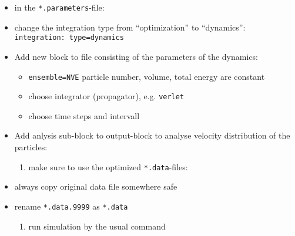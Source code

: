 \documentclass[11pt]{article}
\begin{document}
\begin{itemize}
\item in the \texttt{*.parameters}-file:
\item change the integration type from ``optimization'' to ``dynamics'': \texttt{integration: type=dynamics}
\item Add new block to file consisting of the parameters of the dynamics:

\begin{itemize}
\item \texttt{ensemble=NVE} particle number, volume, total energy are constant
\item choose integrator (propagator), e.g. \texttt{verlet}
\item choose time steps and intervall
\end{itemize}

\item Add anlysis sub-block to output-block to analyse velocity distribution of the particles:

\begin{enumerate}
\item make sure to use the optimized \texttt{*.data}-files:
\end{enumerate}

\item always copy original data file somewhere safe
\item rename \texttt{*.data.9999} as \texttt{*.data}

\begin{enumerate}
\item run simulation by the usual command
\end{enumerate}

\end{itemize}
\end{document}
